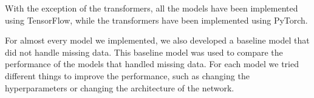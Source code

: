 With the exception of the transformers, all the models have been implemented using TensorFlow, while the transformers have been implemented using PyTorch.

For almost every model we implemented, we also developed a baseline model that did not handle missing data.
This baseline model was used to compare the performance of the models that handled missing data.
For each model we tried different things to improve the performance, such as changing the hyperparameters or changing the architecture of the network.
 



